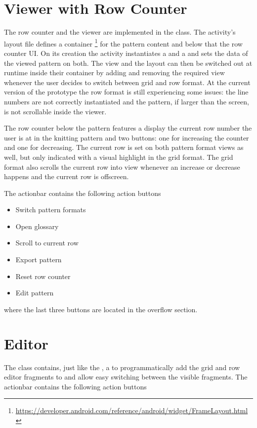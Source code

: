 \section{Viewer with Row Counter}
The row counter and the viewer are implemented in the  class. The activity's layout file defines a container \footnote{\url{https://developer.android.com/reference/android/widget/FrameLayout.html}} for the pattern content and below that the row counter \gls{UI}. On its creation the activity instantiates a  and a  and sets the data of the viewed pattern on both. The view and the layout can then be switched out at runtime inside their container by adding and removing the required view whenever the user decides to switch between grid and row format.
At the current version of the prototype the row format is still experiencing some issues: the line numbers are not correctly instantiated and the pattern, if larger than the screen, is not scrollable inside the viewer.

The row counter below the pattern features a display the current row number the user is at in the knitting pattern and two buttons: one for increasing the counter and one for decreasing. The current row is set on both pattern format views as well, but only indicated with a visual highlight in the grid format. The grid format also scrolls the current row into view whenever an increase or decrease happens and the current row is offscreen. 

The actionbar contains the following action buttons

\begin{itemize}
\item Switch pattern formats
\item Open glossary
\item Scroll to current row
\item Export pattern
\item Reset row counter
\item Edit pattern
\end{itemize}

where the last three buttons are located in the overflow section.

\section{Editor}
The class  contains, just like the , a  to programmatically add the grid and row editor fragments to and allow easy switching between the visible fragments. The actionbar contains the following action buttons 

